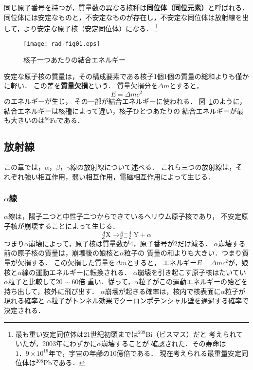 \documentclass[a4j,10pt,oneside,openany]{jsbook}
\begin{document}
同じ原子番号を持つが，質量数の異なる核種は{\bf 同位体（同位元素）}と呼ばれる．
同位体には安定なものと，不安定なものが存在し，不安定な同位体は放射線を出して，より安定な原子核（安定同位体）になる．
\footnote{最も重い安定同位体は21世紀初頭までは$^{209}$Bi（ビスマス）だと
考えられていたが，2003年にわずかに$\alpha$崩壊することが
確認された．その寿命は$1．9\times 10^{19}$年で，宇宙の年齢の10億倍である．
現在考えられる最重量安定同位体は$^{208}$Pbである．}


\begin{figure}
  \begin{center}
    \texttt{[image: rad-fig01.eps]}%
  \end{center}
  \caption{核子一つあたりの結合エネルギー}%
  \label{fig:rad-fig01}%
\end{figure}


安定な原子核の質量は，その構成要素である核子1個1個の質量の総和よりも僅かに軽い．
この差を{\bf 質量欠損}という．
質量欠損分を$\Delta m$とすると，
\begin{equation}
  E = \Delta m c^2
\end{equation}
のエネルギーが生じ，
その一部が結合エネルギーに使われる．
図~\ref{fig:rad-fig01}のように，結合エネルギーは核種によって違い，核子ひとつあたりの
結合エネルギーが最も大きいのは$^{56}$Feである．

\subsection{放射線}

この章では，$\alpha$，$\beta$，$\gamma$線の放射線について述べる．
これら三つの放射線は，それぞれ強い相互作用，弱い相互作用，電磁相互作用によって生じる．

\subsubsection{$\alpha$線}

$\alpha$線は，陽子二つと中性子二つからできているヘリウム原子核であり，
不安定原子核が崩壊することによって生じる．
\begin{equation}
  ^{A}_{Z}\mbox{X}\to ^{A-4}_{Z-2}\mbox{Y}+\alpha
\end{equation}
つまり$\alpha$崩壊によって，原子核は質量数が4，原子番号が2だけ減る．
$\alpha$崩壊する前の原子核の質量は，崩壊後の娘核と$\alpha$粒子の
質量の和よりも大きい．つまり質量が欠損する．
この欠損した質量を$\Delta m$とすると，
エネルギー$E=\Delta m c^2$が，娘核と$\alpha$線の運動エネルギーに転換される．
$\alpha$崩壊を引き起こす原子核はたいてい$\alpha$粒子と比較して$20\sim 60$倍
重い．従って，$\alpha$粒子がこの運動エネルギーの殆どを持ち出して，核外に飛び出す．
$\alpha$崩壊が起きる確率は，核内で核表面に$\alpha$粒子が現れる確率と
$\alpha$粒子がトンネル効果でクーロンポテンシャル壁を通過する確率で決定される．
\end{document}
